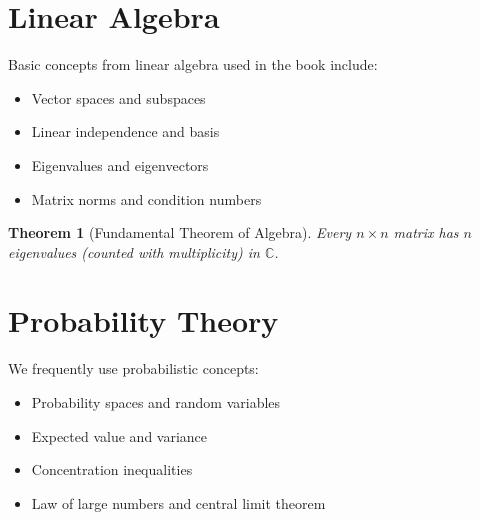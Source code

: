 \documentclass[11pt,twoside,openright]{book}
\theoremstyle{plain}
\newtheorem{theorem}{Theorem}[chapter]
\theoremstyle{definition}
\theoremstyle{remark}
\newcommand{\C}{\mathbb{C}}
\begin{document}
\section{Linear Algebra}
\label{app:linalg}

Basic concepts from linear algebra used in the book include:

\begin{itemize}[itemsep=0.3em]
    \item Vector spaces and subspaces
    \item Linear independence and basis
    \item Eigenvalues and eigenvectors
    \item Matrix norms and condition numbers
\end{itemize}

\begin{theorem}[Fundamental Theorem of Algebra]
\label{thm:fta}
Every $n \times n$ matrix has $n$ eigenvalues (counted with multiplicity) in $\C$.
\end{theorem}

\section{Probability Theory}
\label{app:probability}

We frequently use probabilistic concepts:

\begin{itemize}[itemsep=0.3em]
    \item Probability spaces and random variables
    \item Expected value and variance
    \item Concentration inequalities
    \item Law of large numbers and central limit theorem
\end{itemize}

% 
% 
\end{document}
